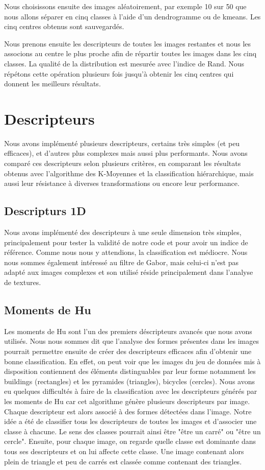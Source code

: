 \documentclass[12pt,a4paper,utf8x]{report}
\begin{document}
    Nous choisissons ensuite des images aléatoirement, par exemple 10 sur 50 que nous allons séparer en cinq classes à l'aide d'un dendrogramme ou de kmeans. Les cinq centres obtenus sont sauvegardés.

    Nous prenons ensuite les descripteurs de toutes les images restantes et nous les associons au centre le plus proche afin de répartir toutes les images dans les cinq classes. La qualité de la distribution est mesurée avec l'indice de Rand. Nous répétons cette opération plusieurs fois jusqu'à obtenir les cinq centres qui donnent les meilleurs résultats.


\chapter{Descripteurs}
    Nous avons implémenté plusieurs descripteurs, certains très simples (et peu efficaces), et d'autres plus complexes mais aussi plus performants. Nous avons comparé ces descripteurs selon plusieurs critères, en comparant les résultats obtenus avec l'algorithme des K-Moyennes et la classification hiérarchique, mais aussi leur résistance à diverses transformations ou encore leur performance.

    \section{Descripturs 1D}
        Nous avons implémenté des descripteurs à une seule dimension très simples, principalement pour tester la validité de notre code et pour avoir un indice de référence. Comme nous nous y attendions, la classification est médiocre. Nous nous sommes également intéressé au filtre de Gabor, mais celui-ci n'est pas adapté aux images complexes et son utilisé réside principalement dans l'analyse de textures.

    \section{Moments de Hu}

        Les moments de Hu sont l'un des premiers déscripteurs avancés que nous avons utilisés. Nous nous sommes dit que l'analyse des formes présentes dans les images pourrait permettre ensuite de créer des descripteurs efficaces afin d'obtenir une bonne classification. En effet, on peut voir que les images du jeu de données mis à disposition contiennent des éléments distinguables par leur forme notamment les buildings (rectangles) et les pyramides (triangles), bicycles (cercles). Nous avons eu quelques difficultés à faire de la classification avec les descripteurs générés par les moments de Hu car cet algorithme génère plusieurs descripteurs par image. Chaque descripteur est alors associé à des formes détectées dans l'image. Notre idée a été de classifier tous les descripteurs de toutes les images et d'associer une classe à chacune. Le sens des classes pourrait ainsi être "être un carré" ou "être un cercle". Ensuite, pour chaque image, on regarde quelle classe est dominante dans tous ses descripteurs et on lui affecte cette classe. Une image contenant alors plein de triangle et peu de carrés est classée comme contenant des triangles.
\end{document}
